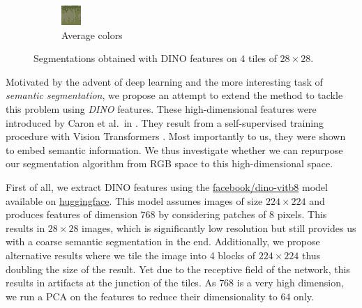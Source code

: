 \documentclass[11pt,a4paper]{article}
\begin{document}
\begin{figure}
\begin{subfigure}[b]{0.3\textwidth}
        \includegraphics[width=\textwidth]{figures/dino/tile_2/253027_avg.png}
        \caption{Average colors}
    \end{subfigure}
       \caption{Segmentations obtained with DINO features on $4$ tiles of $28\times 28$.}
       \label{fig:results-dino-tile2}
\end{figure}

Motivated by the advent of deep learning and the more interesting task of \textit{semantic segmentation}, we propose an attempt to extend the method to tackle this problem using \textit{DINO} features. These high-dimensional features were introduced by Caron et al.\ in \cite{dino}. They result from a self-supervised training procedure with Vision Transformers \cite{transformers}. Most importantly to us, they were shown to embed semantic information. We thus investigate whether we can repurpose our segmentation algorithm from RGB space to this high-dimensional space.

First of all, we extract DINO features using the \href{https://huggingface.co/facebook/dino-vitb8}{facebook/dino-vitb8} model available on \href{https://huggingface.co/}{huggingface}. This model assumes images of size $224\times 224$ and produces features of dimension $768$ by considering patches of 8 pixels. This results in $28\times 28$ images, which is significantly low resolution but still provides us with a coarse semantic segmentation in the end. Additionally, we propose alternative results where we tile the image into 4 blocks of $224\times 224$ thus doubling the size of the result. Yet due to the receptive field of the network, this results in artifacts at the junction of the tiles. As $768$ is a very high dimension, we run a PCA on the features to reduce their dimensionality to 64 only.
\end{document}
